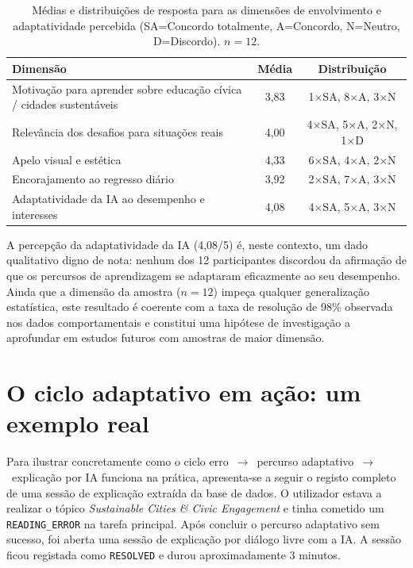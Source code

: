 \begin{table}[h]
	\centering
	\small
	\begin{tabular}{p{7.8cm} c c}
		\toprule
		\textbf{Dimensão} & \textbf{Média} & \textbf{Distribuição} \\
		\midrule
		Motivação para aprender sobre educação cívica / cidades sustentáveis &
			3,83 & 1$\times$SA, 8$\times$A, 3$\times$N \\
		Relevância dos desafios para situações reais &
			4,00 & 4$\times$SA, 5$\times$A, 2$\times$N, 1$\times$D \\
		Apelo visual e estética &
			4,33 & 6$\times$SA, 4$\times$A, 2$\times$N \\
		Encorajamento ao regresso diário &
			3,92 & 2$\times$SA, 7$\times$A, 3$\times$N \\
		\midrule
		Adaptatividade da IA ao desempenho e interesses &
			4,08 & 4$\times$SA, 5$\times$A, 3$\times$N \\
		\bottomrule
	\end{tabular}
	\caption[Dimensões de envolvimento e adaptatividade avaliadas]{Médias e distribuições de resposta para as dimensões de envolvimento e adaptatividade percebida (SA=Concordo totalmente, A=Concordo, N=Neutro, D=Discordo). $n=12$.}
	\label{tab:engagement-scores}
\end{table}

A percepção da adaptatividade da IA (4,08/5) é, neste contexto, um dado qualitativo digno de nota: nenhum dos 12 participantes discordou da afirmação de que os percursos de aprendizagem se adaptaram eficazmente ao seu desempenho. Ainda que a dimensão da amostra ($n=12$) impeça qualquer generalização estatística, este resultado é coerente com a taxa de resolução de 98\% observada nos dados comportamentais e constitui uma hipótese de investigação a aprofundar em estudos futuros com amostras de maior dimensão.

\section{O ciclo adaptativo em ação: um exemplo real}
\label{sec:exemplo-conversa}

Para ilustrar concretamente como o ciclo erro~$\to$~percurso adaptativo~$\to$~explicação por IA funciona na prática, apresenta-se a seguir o registo completo de uma sessão de explicação extraída da base de dados. O utilizador estava a realizar o tópico \emph{Sustainable Cities \& Civic Engagement} e tinha cometido um \texttt{READING\_ERROR} na tarefa principal. Após concluir o percurso adaptativo sem sucesso, foi aberta uma sessão de explicação por diálogo livre com a IA. A sessão ficou registada como \texttt{RESOLVED} e durou aproximadamente 3 minutos.

